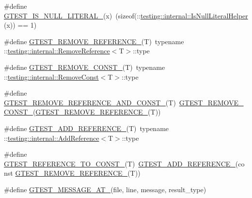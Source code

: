 \begin{DoxyCompactItemize}
\item 
\#define \hyperlink{fused-src_2gtest_2gtest_8h_ae5dd8e23090e08856613878fa1ff6fca}{G\-T\-E\-S\-T\-\_\-\-I\-S\-\_\-\-N\-U\-L\-L\-\_\-\-L\-I\-T\-E\-R\-A\-L\-\_\-}(x)~(sizeof(\-::\hyperlink{namespacetesting_1_1internal_afb0731ba39ffef1fa1730ac0699c9025}{testing\-::internal\-::\-Is\-Null\-Literal\-Helper}(x)) == 1)
\item 
\#define \hyperlink{fused-src_2gtest_2gtest_8h_a84c72f25a6a6600e3ff8381ca6982ae9}{G\-T\-E\-S\-T\-\_\-\-R\-E\-M\-O\-V\-E\-\_\-\-R\-E\-F\-E\-R\-E\-N\-C\-E\-\_\-}(T)~typename \-::\hyperlink{structtesting_1_1internal_1_1_remove_reference}{testing\-::internal\-::\-Remove\-Reference}$<$T$>$\-::type
\item 
\#define \hyperlink{fused-src_2gtest_2gtest_8h_a2ffec8c60510eb130af387f5ce9a756a}{G\-T\-E\-S\-T\-\_\-\-R\-E\-M\-O\-V\-E\-\_\-\-C\-O\-N\-S\-T\-\_\-}(T)~typename \-::\hyperlink{structtesting_1_1internal_1_1_remove_const}{testing\-::internal\-::\-Remove\-Const}$<$T$>$\-::type
\item 
\#define \hyperlink{fused-src_2gtest_2gtest_8h_a874567b176266188fabfffb8393267ce}{G\-T\-E\-S\-T\-\_\-\-R\-E\-M\-O\-V\-E\-\_\-\-R\-E\-F\-E\-R\-E\-N\-C\-E\-\_\-\-A\-N\-D\-\_\-\-C\-O\-N\-S\-T\-\_\-}(T)~\hyperlink{gtest-internal_8h_a2ffec8c60510eb130af387f5ce9a756a}{G\-T\-E\-S\-T\-\_\-\-R\-E\-M\-O\-V\-E\-\_\-\-C\-O\-N\-S\-T\-\_\-}(\hyperlink{gtest-internal_8h_a84c72f25a6a6600e3ff8381ca6982ae9}{G\-T\-E\-S\-T\-\_\-\-R\-E\-M\-O\-V\-E\-\_\-\-R\-E\-F\-E\-R\-E\-N\-C\-E\-\_\-}(T))
\item 
\#define \hyperlink{fused-src_2gtest_2gtest_8h_ab389953fc1f7e4efae30d182a0e0a13b}{G\-T\-E\-S\-T\-\_\-\-A\-D\-D\-\_\-\-R\-E\-F\-E\-R\-E\-N\-C\-E\-\_\-}(T)~typename \-::\hyperlink{structtesting_1_1internal_1_1_add_reference}{testing\-::internal\-::\-Add\-Reference}$<$T$>$\-::type
\item 
\#define \hyperlink{fused-src_2gtest_2gtest_8h_a9f91fcd24cae0b48fdaeb19102dac525}{G\-T\-E\-S\-T\-\_\-\-R\-E\-F\-E\-R\-E\-N\-C\-E\-\_\-\-T\-O\-\_\-\-C\-O\-N\-S\-T\-\_\-}(T)~\hyperlink{gtest-internal_8h_ab389953fc1f7e4efae30d182a0e0a13b}{G\-T\-E\-S\-T\-\_\-\-A\-D\-D\-\_\-\-R\-E\-F\-E\-R\-E\-N\-C\-E\-\_\-}(const \hyperlink{gtest-internal_8h_a84c72f25a6a6600e3ff8381ca6982ae9}{G\-T\-E\-S\-T\-\_\-\-R\-E\-M\-O\-V\-E\-\_\-\-R\-E\-F\-E\-R\-E\-N\-C\-E\-\_\-}(T))
\item 
\#define \hyperlink{fused-src_2gtest_2gtest_8h_a8d70025c45a47a493780746dfd66d565}{G\-T\-E\-S\-T\-\_\-\-M\-E\-S\-S\-A\-G\-E\-\_\-\-A\-T\-\_\-}(file, line, message, result\-\_\-type)

\end{DoxyCompactItemize}
